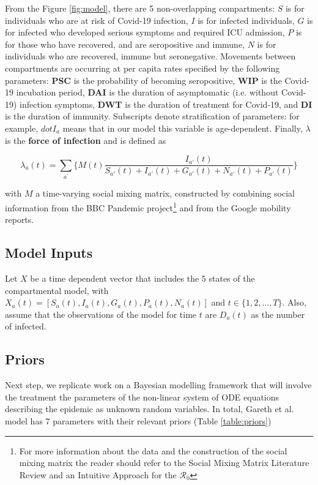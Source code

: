 \documentclass[12pt]{article}
\begin{document}
From the Figure \ref{fig:model}, there are 5 non-overlapping compartments: $S$ is for individuals who are at risk of Covid-19 infection, $I$ is for infected individuals, $G$ is for infected who developed serious symptoms and required ICU admission, $P$ is for those who have recovered, and are seropositive and immune, $N$ is for individuals who are recovered, immune but seronegative. Movements between compartments are occurring at per capita rates specified by the following parameters: \textbf{PSC} is the probability of becoming seropositive, \textbf{WIP} is the Covid-19 incubation period, \textbf{DAI} is the duration of asymptomatic (i.e. without Covid-19) infection symptoms, \textbf{DWT} is the duration of treatment for Covid-19, and \textbf{DI} is the duration of immunity. Subscripts denote stratification of parameters: for example, $dot{I}_{a}$ means that in our model this variable is age-dependent. Finally, $\lambda$ is the \textbf{force of infection} and is defined as

\begin{equation}
\lambda_{a}(t)=\sum_{a^{'}} \bigg\{ M(t) \frac{I_{a'}(t)}{S_{a'}(t) + I_{a'}(t) + G_{a'}(t) + N_{a'}(t) + P_{a'}(t)} \bigg\}
\end{equation}

with $M$ a time-varying social mixing matrix, constructed by combining social information from the BBC Pandemic project\footnote{For more information about the data and the construction of the social mixing matrix the reader should refer to the Social Mixing Matrix Literature Review and an Intuitive Approach for the $\mathcal{R}_{0}$} and from the Google mobility reports.

\subsection{Model Inputs}

Let $X$ be a time dependent vector that includes the 5 states of the compartmental model, with $X_{a}(t)=[S_{a}(t), I_{a}(t), G_{a}(t), P_{a}(t), N_{a}(t)]$ and $t \in \{1,2,\dots,T \}$. Also, assume that the observations of the model for time $t$ are $D_{a}(t)$ as the number of infected.

\subsection{Priors}

Next step, we replicate  work on a Bayesian modelling framework that will involve the treatment the parameters of the non-linear system of ODE equations describing the epidemic as unknown random variables. In total, Gareth et al. model \cite{Gareth:2013} has 7 parameters with their relevant priors (Table \ref{table:priors})
\end{document}

